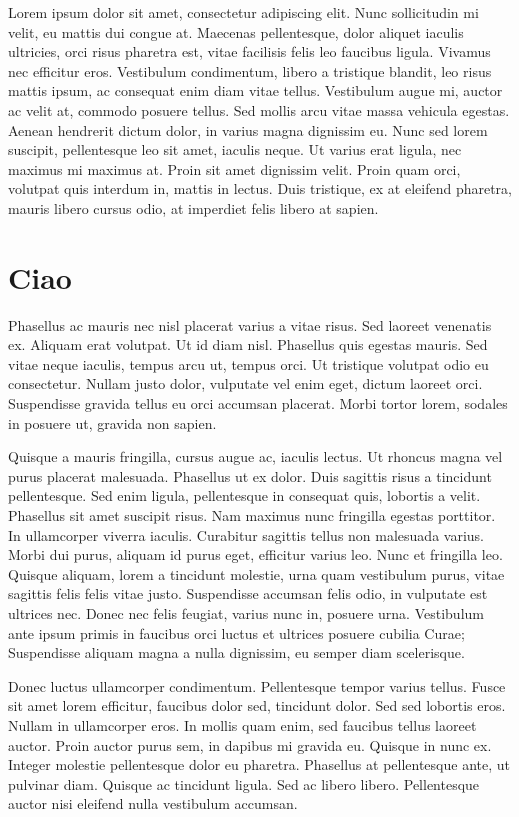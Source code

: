 Lorem ipsum dolor sit amet, consectetur adipiscing elit. Nunc sollicitudin mi velit, eu mattis dui congue at. Maecenas pellentesque, dolor aliquet iaculis ultricies, orci risus pharetra est, vitae facilisis felis leo faucibus ligula. Vivamus nec efficitur eros. Vestibulum condimentum, libero a tristique blandit, leo risus mattis ipsum, ac consequat enim diam vitae tellus. Vestibulum augue mi, auctor ac velit at, commodo posuere tellus. Sed mollis arcu vitae massa vehicula egestas. Aenean hendrerit dictum dolor, in varius magna dignissim eu. Nunc sed lorem suscipit, pellentesque leo sit amet, iaculis neque. Ut varius erat ligula, nec maximus mi maximus at. Proin sit amet dignissim velit. Proin quam orci, volutpat quis interdum in, mattis in lectus. Duis tristique, ex at eleifend pharetra, mauris libero cursus odio, at imperdiet felis libero at sapien.
\section{Ciao}
Phasellus ac mauris nec nisl placerat varius a vitae risus. Sed laoreet venenatis ex. Aliquam erat volutpat. Ut id diam nisl. Phasellus quis egestas mauris. Sed vitae neque iaculis, tempus arcu ut, tempus orci. Ut tristique volutpat odio eu consectetur. Nullam justo dolor, vulputate vel enim eget, dictum laoreet orci. Suspendisse gravida tellus eu orci accumsan placerat. Morbi tortor lorem, sodales in posuere ut, gravida non sapien.

Quisque a mauris fringilla, cursus augue ac, iaculis lectus. Ut rhoncus magna vel purus placerat malesuada. Phasellus ut ex dolor. Duis sagittis risus a tincidunt pellentesque. Sed enim ligula, pellentesque in consequat quis, lobortis a velit. Phasellus sit amet suscipit risus. Nam maximus nunc fringilla egestas porttitor. In ullamcorper viverra iaculis. Curabitur sagittis tellus non malesuada varius. Morbi dui purus, aliquam id purus eget, efficitur varius leo. Nunc et fringilla leo. Quisque aliquam, lorem a tincidunt molestie, urna quam vestibulum purus, vitae sagittis felis felis vitae justo. Suspendisse accumsan felis odio, in vulputate est ultrices nec. Donec nec felis feugiat, varius nunc in, posuere urna. Vestibulum ante ipsum primis in faucibus orci luctus et ultrices posuere cubilia Curae; Suspendisse aliquam magna a nulla dignissim, eu semper diam scelerisque.

Donec luctus ullamcorper condimentum. Pellentesque tempor varius tellus. Fusce sit amet lorem efficitur, faucibus dolor sed, tincidunt dolor. Sed sed lobortis eros. Nullam in ullamcorper eros. In mollis quam enim, sed faucibus tellus laoreet auctor. Proin auctor purus sem, in dapibus mi gravida eu. Quisque in nunc ex. Integer molestie pellentesque dolor eu pharetra. Phasellus at pellentesque ante, ut pulvinar diam. Quisque ac tincidunt ligula. Sed ac libero libero. Pellentesque auctor nisi eleifend nulla vestibulum accumsan.

